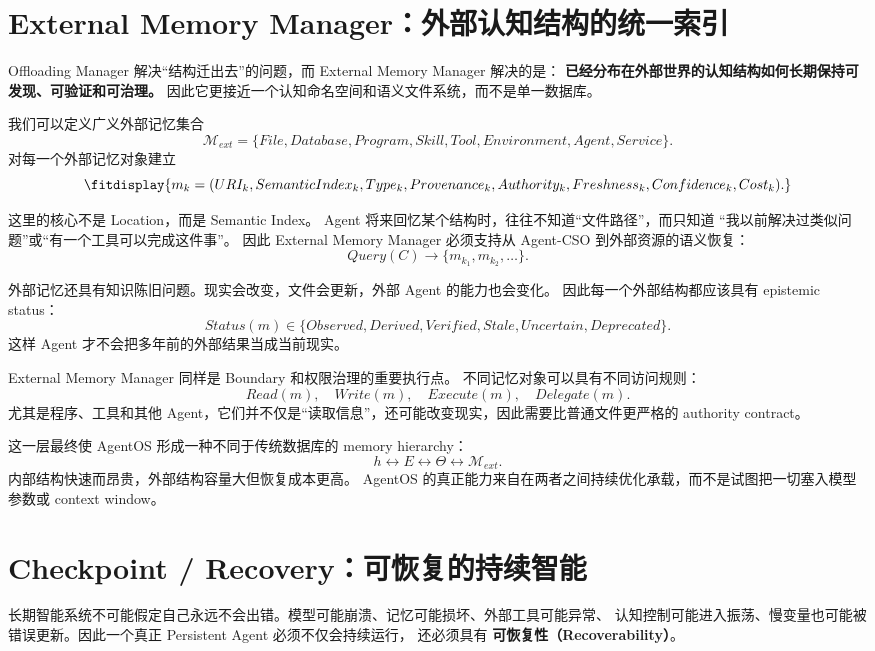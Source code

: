 \section{External Memory Manager：外部认知结构的统一索引}

Offloading Manager 解决``结构迁出去''的问题，而 External Memory Manager 解决的是：
\textbf{已经分布在外部世界的认知结构如何长期保持可发现、可验证和可治理。}
因此它更接近一个认知命名空间和语义文件系统，而不是单一数据库。

我们可以定义广义外部记忆集合
\[
\mathcal M_{ext}
=
\{
File,
Database,
Program,
Skill,
Tool,
Environment,
Agent,
Service
\}.
\]
对每一个外部记忆对象建立
\[
\fitdisplay{
m_k=
(
URI_k,
SemanticIndex_k,
Type_k,
Provenance_k,
Authority_k,
Freshness_k,
Confidence_k,
Cost_k
).
}
\]

这里的核心不是 Location，而是 Semantic Index。
Agent 将来回忆某个结构时，往往不知道``文件路径''，而只知道
``我以前解决过类似问题''或``有一个工具可以完成这件事''。
因此 External Memory Manager 必须支持从 Agent-CSO 到外部资源的语义恢复：
\[
Query(C)
\rightarrow
\{m_{k_1},m_{k_2},\ldots\}.
\]

外部记忆还具有知识陈旧问题。现实会改变，文件会更新，外部 Agent 的能力也会变化。
因此每一个外部结构都应该具有 epistemic status：
\[
Status(m)
\in
\{
Observed,
Derived,
Verified,
Stale,
Uncertain,
Deprecated
\}.
\]
这样 Agent 才不会把多年前的外部结果当成当前现实。

External Memory Manager 同样是 Boundary 和权限治理的重要执行点。
不同记忆对象可以具有不同访问规则：
\[
Read(m),\quad
Write(m),\quad
Execute(m),\quad
Delegate(m).
\]
尤其是程序、工具和其他 Agent，它们并不仅是``读取信息''，还可能改变现实，因此需要比普通文件更严格的 authority contract。

这一层最终使 AgentOS 形成一种不同于传统数据库的 memory hierarchy：
\[
h
\leftrightarrow
E
\leftrightarrow
\Theta
\leftrightarrow
\mathcal M_{ext}.
\]
内部结构快速而昂贵，外部结构容量大但恢复成本更高。
AgentOS 的真正能力来自在两者之间持续优化承载，而不是试图把一切塞入模型参数或 context window。


\section{Checkpoint / Recovery：可恢复的持续智能}

长期智能系统不可能假定自己永远不会出错。模型可能崩溃、记忆可能损坏、外部工具可能异常、
认知控制可能进入振荡、慢变量也可能被错误更新。因此一个真正 Persistent Agent 必须不仅会持续运行，
还必须具有
\textbf{可恢复性（Recoverability）}。

